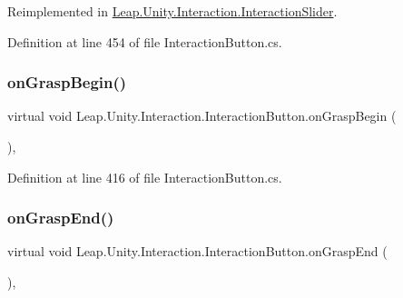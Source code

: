 Reimplemented in \mbox{\hyperlink{class_leap_1_1_unity_1_1_interaction_1_1_interaction_slider_a231a11f6e3fdd351816de72c016a9b19}{Leap.\+Unity.\+Interaction.\+Interaction\+Slider}}.



Definition at line 454 of file Interaction\+Button.\+cs.

\mbox{\label{class_leap_1_1_unity_1_1_interaction_1_1_interaction_button_a4eaa465478ec3488601a4a8f4a1ef8dd}} 
\subsubsection{\texorpdfstring{onGraspBegin()}{onGraspBegin()}}
{\footnotesize\ttfamily virtual void Leap.\+Unity.\+Interaction.\+Interaction\+Button.\+on\+Grasp\+Begin (\begin{DoxyParamCaption}{ }\end{DoxyParamCaption})\hspace{0.3cm}{\ttfamily [protected]}, {\ttfamily [virtual]}}



Definition at line 416 of file Interaction\+Button.\+cs.

\mbox{\label{class_leap_1_1_unity_1_1_interaction_1_1_interaction_button_ae4b4b7cc59277eee7fe17fdb6a07652d}} 
\subsubsection{\texorpdfstring{onGraspEnd()}{onGraspEnd()}}
{\footnotesize\ttfamily virtual void Leap.\+Unity.\+Interaction.\+Interaction\+Button.\+on\+Grasp\+End (\begin{DoxyParamCaption}{ }\end{DoxyParamCaption})\hspace{0.3cm}{\ttfamily [protected]}, {\ttfamily [virtual]}}



